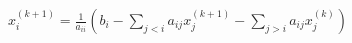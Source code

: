 \documentclass[preview]{standalone}
\begin{document}
\begin{align*}
x_i^{(k+1)} = \frac{1}{a_{ii}} \left( b_i - \sum_{j<i} a_{ij} x_j^{(k+1)} - \sum_{j>i} a_{ij} x_j^{(k)} \right)
\end{align*}
\end{document}
